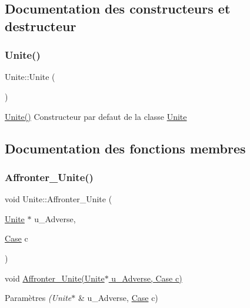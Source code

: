 \subsection{Documentation des constructeurs et destructeur}
\mbox{\label{classUnite_a4fed2aa808630902de024d0a2f29887c}} 
\subsubsection{\texorpdfstring{Unite()}{Unite()}}
{\footnotesize\ttfamily Unite\+::\+Unite (\begin{DoxyParamCaption}{ }\end{DoxyParamCaption})}

\hyperlink{classUnite_a4fed2aa808630902de024d0a2f29887c}{Unite()} Constructeur par defaut de la classe \hyperlink{classUnite}{Unite} 

\subsection{Documentation des fonctions membres}
\mbox{\label{classUnite_a6bdba152d60733e7805d841409af932d}} 
\subsubsection{\texorpdfstring{Affronter\+\_\+\+Unite()}{Affronter\_Unite()}}
{\footnotesize\ttfamily void Unite\+::\+Affronter\+\_\+\+Unite (\begin{DoxyParamCaption}\item[{\hyperlink{classUnite}{Unite} $\ast$}]{u\+\_\+\+Adverse,  }\item[{\hyperlink{classCase}{Case}}]{c }\end{DoxyParamCaption})}



void \hyperlink{classUnite_a6bdba152d60733e7805d841409af932d}{Affronter\+\_\+\+Unite(\+Unite$\ast$ u\+\_\+\+Adverse, Case c)} 


\begin{DoxyParams}{Paramètres}
{\em (\+Unite$\ast$} & u\+\_\+\+Adverse, \hyperlink{classCase}{Case} c) \\
\hline
\end{DoxyParams}
\mbox{\label{classUnite_ab4a981ed28ae5c8fcdbbf265fa01634a}} 
